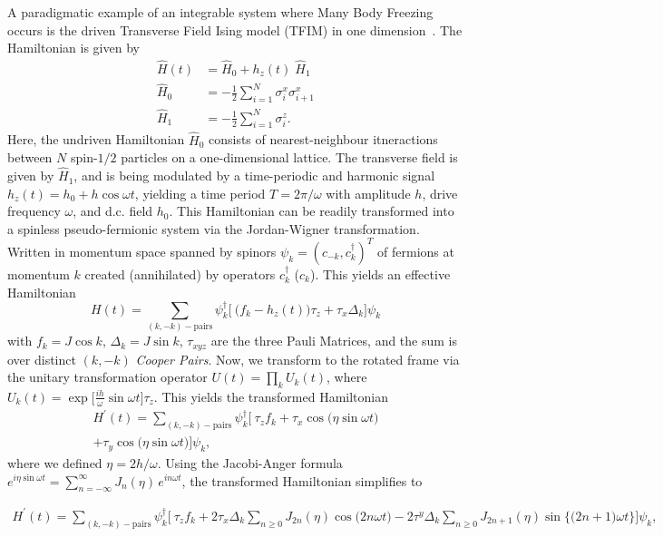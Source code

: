 \documentclass[%
 reprint,
superscriptaddress,
 amsmath,amssymb,
 aps,
prb,
]{revtex4-2}
\begin{document}
A paradigmatic example of an integrable system where Many Body Freezing occurs is  the driven Transverse Field Ising model (TFIM) in one dimension~\cite{stinchcombe_ising_1973}. The Hamiltonian is given by
\begin{align}
  \label{eq:tfim:hamilt}
	\hat{H}(t) &= \hat{H}_0 + h_z(t) \; \hat{H}_1\\
	\hat{H}_0 &= -\frac{1}{2}\sum^N_{i=1} \sigma^x_i \sigma^x_{i+1}\\
	\hat{H}_1 &= -\frac{1}{2}\sum_{i=1}^N \sigma^z_{i}.
\end{align}
Here, the undriven Hamiltonian $\hat{H}_0$ consists of nearest-neighbour itneractions between $N$ spin-$1/2$ particles on a one-dimensional lattice. The transverse field is given by $\hat{H}_1$, and is being modulated by a time-periodic and harmonic signal $h_z(t) = h_0 + h\cos{\omega t}$, yielding a time period $T=2\pi/\omega$ with amplitude $h$, drive frequency $\omega$, and d.c. field $h_0$. This Hamiltonian can be readily transformed into a spinless pseudo-fermionic system via the Jordan-Wigner transformation. Written in momentum space spanned by spinors $\psi_k = (c_{-k}, c^\dagger_k)^T$ of fermions at momentum $k$ created (annihilated) by operators $c^\dagger_k$ ($c_k$). This yields an effective Hamiltonian ~\cite{mbeng_quantum_2020}
\begin{equation}
	H(t) = \sum_{(k,-k)-\mbox{pairs}} \psi^\dagger_k
	\Bigg[\ \bigg(f_k - h_z(t)\bigg)\tau_z +  \tau_x \Delta_k\Bigg]\psi_k
\end{equation}
with $f_k = J\cos{k}$, $\Delta_k = J\sin{k}$, $\tau_{xyz}$ are the three Pauli Matrices, and the sum is over distinct $(k, -k)$ \textit{Cooper Pairs}. Now, we transform to the rotated frame via the unitary transformation operator $U(t) = \prod_k U_k(t)$, where $U_k(t) = \exp{\Big[\frac{i h}{\omega}\sin{\omega t}\Big]\tau_z}$. This yields the transformed Hamiltonian
\begin{multline*}
	H^\prime(t) = \sum_{(k,-k)-\mbox{pairs}} \psi^\dagger_k
	\bigg[\ \tau_z f_k + \tau_x \cos{\big(\eta\sin{\omega t}\big)}  \\
	+ \tau_y \cos{\big(\eta\sin{\omega t}\big)}\bigg]\psi_k,
\end{multline*}
where we defined $\eta=2h/\omega$. Using the Jacobi-Anger formula $e^{i \eta \sin{\omega t}} = \sum_{n=-\infty}^{\infty} J_n(\eta)\, e^{i n \omega t}$, the transformed Hamiltonian simplifies to 
\begin{widetext}
\begin{align*}
	H^\prime(t) = \sum_{(k,-k)-\mbox{pairs}} \psi^\dagger_k
	\bigg[\ \tau_z f_k + 2\tau_x \Delta_k \sum_{n\geq 0} J_{2n}(\eta)\cos{\big(2n\omega t\big)} - 2\tau^y\Delta_k \sum_{n\geq 0} J_{2n+1}(\eta)\sin{\big\{\big(2n+1\big)\omega t\big\}}   \bigg]\psi_k,
\end{align*}
\end{widetext}
\end{document}
